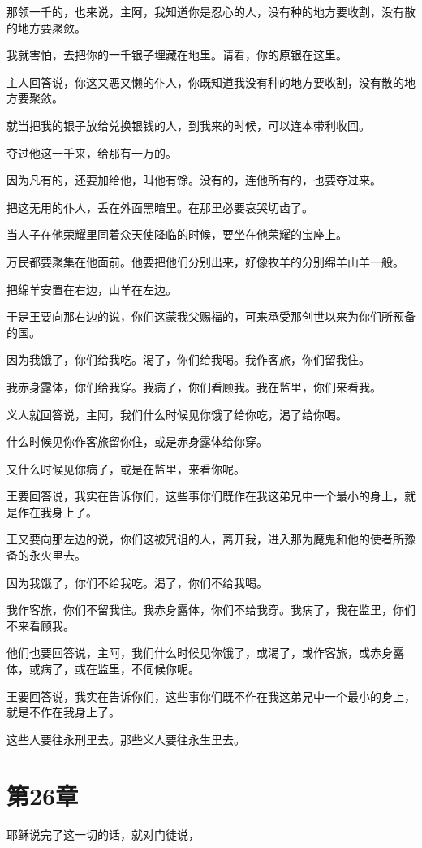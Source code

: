\documentclass[12pt,oneside]{book}
\begin{document}
那领一千的，也来说，主阿，我知道你是忍心的人，没有种的地方要收割，没有散的地方要聚敛。

我就害怕，去把你的一千银子埋藏在地里。请看，你的原银在这里。

主人回答说，你这又恶又懒的仆人，你既知道我没有种的地方要收割，没有散的地方要聚敛。

就当把我的银子放给兑换银钱的人，到我来的时候，可以连本带利收回。

夺过他这一千来，给那有一万的。

因为凡有的，还要加给他，叫他有馀。没有的，连他所有的，也要夺过来。

把这无用的仆人，丢在外面黑暗里。在那里必要哀哭切齿了。

当人子在他荣耀里同着众天使降临的时候，要坐在他荣耀的宝座上。

万民都要聚集在他面前。他要把他们分别出来，好像牧羊的分别绵羊山羊一般。

把绵羊安置在右边，山羊在左边。

于是王要向那右边的说，你们这蒙我父赐福的，可来承受那创世以来为你们所预备的国。

因为我饿了，你们给我吃。渴了，你们给我喝。我作客旅，你们留我住。

我赤身露体，你们给我穿。我病了，你们看顾我。我在监里，你们来看我。

义人就回答说，主阿，我们什么时候见你饿了给你吃，渴了给你喝。

什么时候见你作客旅留你住，或是赤身露体给你穿。

又什么时候见你病了，或是在监里，来看你呢。

王要回答说，我实在告诉你们，这些事你们既作在我这弟兄中一个最小的身上，就是作在我身上了。

王又要向那左边的说，你们这被咒诅的人，离开我，进入那为魔鬼和他的使者所豫备的永火里去。

因为我饿了，你们不给我吃。渴了，你们不给我喝。

我作客旅，你们不留我住。我赤身露体，你们不给我穿。我病了，我在监里，你们不来看顾我。

他们也要回答说，主阿，我们什么时候见你饿了，或渴了，或作客旅，或赤身露体，或病了，或在监里，不伺候你呢。

王要回答说，我实在告诉你们，这些事你们既不作在我这弟兄中一个最小的身上，就是不作在我身上了。

这些人要往永刑里去。那些义人要往永生里去。

\chapter{第26章}
耶稣说完了这一切的话，就对门徒说，
\end{document}
